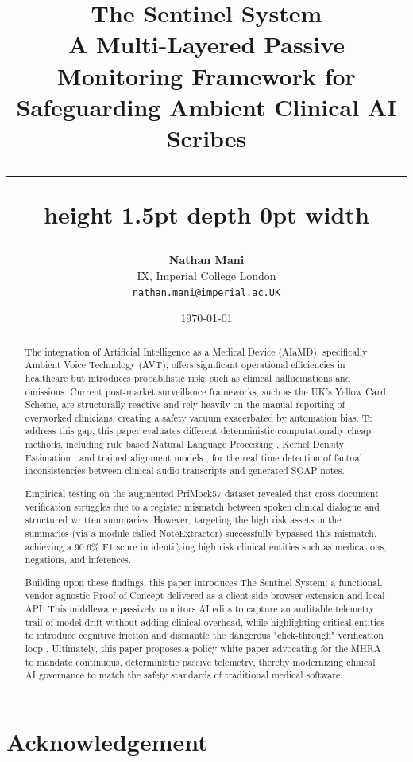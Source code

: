 \documentclass[11pt,a4paper]{article}
\title{
    \vspace{-10mm}
    \Huge \bfseries \color{ImperialBlue} The Sentinel System \\
    \vspace{4mm}
    \large \color{ImperiaidarkBlue} A Multi-Layered Passive Monitoring Framework for Safeguarding Ambient Clinical AI Scribes \\
    \vspace{4mm}
    \hrule height 1.5pt depth 0pt width \textwidth
}
\author{
    \textbf{Nathan Mani } \\
    \small IX, Imperial College London \\
    \small \texttt{nathan.mani@imperial.ac.UK}
}
\date{\today}
\begin{document}
\maketitle
\thispagestyle{fancy}

\begin{abstract}
The integration of Artificial Intelligence as a Medical Device (AIaMD), specifically Ambient Voice Technology (AVT), offers significant operational efficiencies in healthcare but introduces probabilistic risks such as clinical hallucinations and omissions. Current post-market surveillance frameworks, such as the UK's Yellow Card Scheme, are structurally reactive and rely heavily on the manual reporting of overworked clinicians, creating a safety vacuum exacerbated by automation bias. To address this gap, this paper  evaluates different deterministic computationally cheap methods, including rule based Natural Language Processing , Kernel Density Estimation , and trained alignment models , for the real time detection of factual inconsistencies between clinical audio transcripts and generated SOAP notes. 

Empirical testing on the augmented PriMock57 dataset revealed that cross document verification struggles due to a register mismatch between spoken clinical dialogue and structured written summaries. However, targeting the high risk assets in the summaries (via a module called NoteExtractor) successfully bypassed this mismatch, achieving a 90.6\% F1 score in identifying high risk clinical entities such as medications, negations, and inferences. 

Building upon these findings, this paper  introduces The Sentinel System: a functional, vendor-agnostic Proof of Concept delivered as a client-side browser extension and local API. This middleware passively monitors AI edits to capture an auditable telemetry trail of model drift without adding clinical overhead, while highlighting critical entities to introduce cognitive friction and dismantle the dangerous "click-through" verification loop . Ultimately, this paper proposes a policy white paper advocating for the MHRA to mandate continuous, deterministic passive telemetry, thereby modernizing clinical AI governance to match the safety standards of traditional medical software.

\end{abstract}
\newpage

\section*{Acknowledgement}
\end{document}
